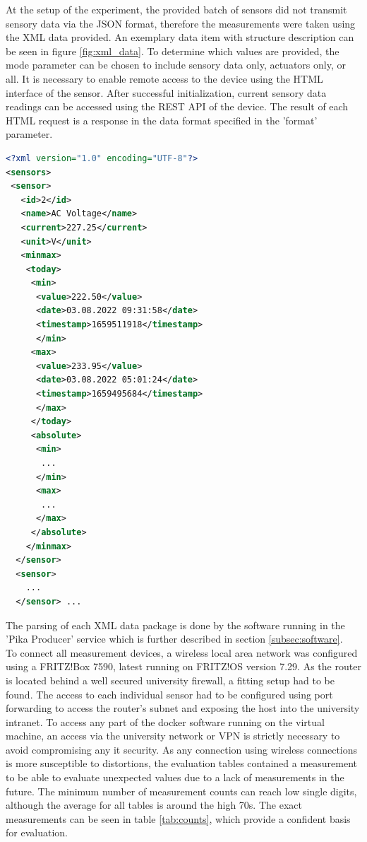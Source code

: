 At the setup of the experiment, the provided batch of sensors did not transmit sensory data via the JSON format, therefore the measurements were taken using the XML data provided. An exemplary data item with structure description can be seen in figure \ref{fig:xml_data}.
To determine which values are provided, the mode parameter can be chosen to include sensory data only, actuators only, or all. It is necessary to enable remote access to the device using the HTML interface of the sensor. After successful initialization, current sensory data readings can be accessed using the REST API of the device. The result of each HTML request is a response in the data format specified in the 'format' parameter.
\newpage

\begin{lstlisting}[language=xml, caption={Example data item from a power measurement.}, label={fig:xml_data}]
<?xml version="1.0" encoding="UTF-8"?>
<sensors>
 <sensor>
   <id>2</id>
   <name>AC Voltage</name>
   <current>227.25</current>
   <unit>V</unit>
   <minmax>
    <today>
     <min>
      <value>222.50</value>
      <date>03.08.2022 09:31:58</date>
      <timestamp>1659511918</timestamp>
      </min>
     <max>
      <value>233.95</value>
      <date>03.08.2022 05:01:24</date>
      <timestamp>1659495684</timestamp>
      </max>
     </today>
     <absolute>
      <min>
       ...
      </min>
      <max>
       ...
      </max>
     </absolute>
    </minmax>
  </sensor>
  <sensor>
    ...
  </sensor> ...
\end{lstlisting}

The parsing of each XML data package is done by the software running in the 'Pika Producer' service which is further described in section \ref{subsec:software}.
\\
To connect all measurement devices, a wireless local area network was configured using a FRITZ!Box 7590, latest running on FRITZ!OS version 7.29.
As the router is located behind a well secured university firewall, a fitting setup had to be found. 
The access to each individual sensor had to be configured using port forwarding to access the router's subnet and exposing the host into the university intranet. To access any part of the docker software running on the virtual machine, an access via the university network or VPN is strictly necessary to avoid compromising any it security. As any connection using wireless connections is more susceptible to distortions, the evaluation tables contained a measurement to be able to evaluate unexpected values due to a lack of measurements in the future. The minimum number of measurement counts can reach low single digits, although the average for all tables is around the high 70s. The exact measurements can be seen in table \ref{tab:counts}, which provide a confident basis for evaluation.


